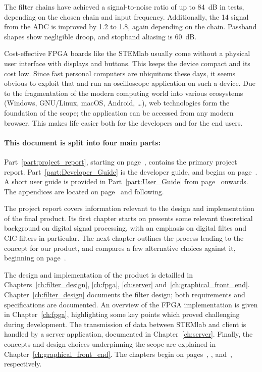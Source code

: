 The filter chains have achieved a  signal-to-noise ratio of up to \SI{84}{\dB}
in tests,  depending on  the chosen  chain and  input frequency. Additionally,
the  \SI{14}{\bit}  signal from  the  ADC  is  improved by  \SI{1.2}{\bit}  to
\SI{1.8}{\bit}, again depending on  the chain. Passband shapes show negligible
droop, and stopband aliasing is \SI{60}{\dB}.

Cost-effective FPGA  boards like the  STEMlab usually come without  a physical
user interface  with displays and  buttons. This keeps the device  compact and
its cost  low.  Since fast  personal computers  are ubiquitous these  days, it
seems obvious  to exploit that and  run an oscilloscope application  on such a
device. Due to  the fragmentation of  the modern computing world  into various
ecosystems (Windows, GNU/Linux, macOS, Android, \ldots), web technologies form
the foundation of  the scope; the application can be  accessed from any modern
browser. This makes life easier both for the developers and for the end users.

\paragraph{This        document        is        split        into        four
main        parts:} Part~\ref{part:project_report},         starting        on
page~\pageref{part:project_report},     contains    the     primary    project
report. Part~\ref{part:Developer_Guide}  is the  developer  guide, and  begins
on  page~\pageref{part:Developer_Guide}. A short  user  guide  is provided  in
Part~\ref{part:User_Guide}  from  page~\pageref{part:User_Guide}  onwards. The
appendices are located on page~\pageref{ch:app:fdesign} and following.

The   project  report   covers  information   relevant  to   the  design   and
implementation of the final product. Its first chapter starts on presents some
relevant theoretical background on digital signal processing, with an emphasis
on digital  filtes  and CIC  filters in particular. The next  chapter outlines
the  process leading  to  the concept  for  our product,  and  compares a  few
alternative choices against it, beginning on page~\pageref{ch:mission}.

The    design   and    implementation    of   the    product   is    detailled
in     Chapters~\ref{ch:filter_design},     \ref{ch:fpga},     \ref{ch:server}
and~\ref{ch:graphical_front_end}. Chapter~\ref{ch:filter_design} documents the
filter  design;  both  requirements   and  specifications  are  documented. An
overview  of  the  FPGA  implementation  is  given  in  Chapter~\ref{ch:fpga},
highlighting some key points  which proved challenging during development. The
transmission   of   data   between   STEMlab  and   client   is   handled   by
a   server   application,  documented   in   Chapter~\ref{ch:server}. Finally,
the    concepts   and    design   choices    underpinning   the    scope   are
explained   in    Chapter~\ref{ch:graphical_front_end}. The   chapters   begin
on  pages~\pageref{ch:filter_design},  \pageref{ch:fpga},  \pageref{ch:server}
and~\pageref{ch:graphical_front_end}, respectively.

